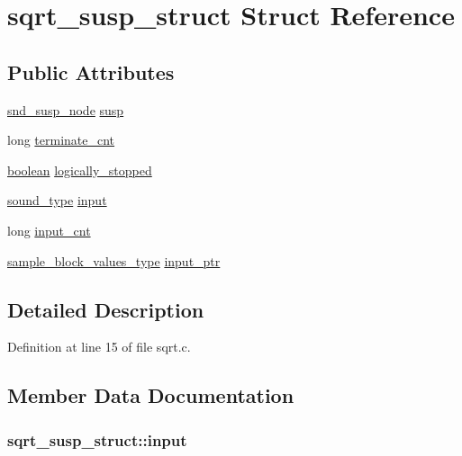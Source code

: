 \hypertarget{structsqrt__susp__struct}{}\section{sqrt\+\_\+susp\+\_\+struct Struct Reference}
\label{structsqrt__susp__struct}
\subsection*{Public Attributes}
\begin{DoxyCompactItemize}
\item 
\hyperlink{sound_8h_a6b268203688a934bd798ceb55f85d4c0}{snd\+\_\+susp\+\_\+node} \hyperlink{structsqrt__susp__struct_ac8190bf38cc5a145a4b9a5bb8443044b}{susp}
\item 
long \hyperlink{structsqrt__susp__struct_aa85a35584385b8fa02cf23e17b209ebc}{terminate\+\_\+cnt}
\item 
\hyperlink{cext_8h_a7670a4e8a07d9ebb00411948b0bbf86d}{boolean} \hyperlink{structsqrt__susp__struct_a023576444088e4aec1d15f5db3ac08cc}{logically\+\_\+stopped}
\item 
\hyperlink{sound_8h_a792cec4ed9d6d636d342d9365ba265ea}{sound\+\_\+type} \hyperlink{structsqrt__susp__struct_ae0e711133b530da97eb38b12e4a578c2}{input}
\item 
long \hyperlink{structsqrt__susp__struct_a8c11c6f3fb7e2558e2a691d96fe1b4b3}{input\+\_\+cnt}
\item 
\hyperlink{sound_8h_a83d17f7b465d1591f27cd28fc5eb8a03}{sample\+\_\+block\+\_\+values\+\_\+type} \hyperlink{structsqrt__susp__struct_a6be79e150b982314667588e148ddd8bd}{input\+\_\+ptr}
\end{DoxyCompactItemize}


\subsection{Detailed Description}


Definition at line 15 of file sqrt.\+c.



\subsection{Member Data Documentation}
\subsubsection[{\texorpdfstring{input}{input}}]{ sqrt\+\_\+susp\+\_\+struct\+::input}\hypertarget{structsqrt__susp__struct_ae0e711133b530da97eb38b12e4a578c2}{}\label{structsqrt__susp__struct_ae0e711133b530da97eb38b12e4a578c2}


